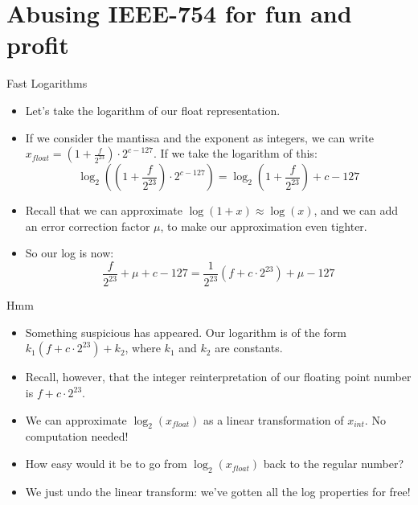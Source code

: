 \documentclass[aspectratio=169]{beamer}
\begin{document}
\section{Abusing IEEE-754 for fun and profit}
\frame{\sectionpage}

\begin{frame}{Fast Logarithms}
    \begin{itemize}
        \item Let's take the logarithm of our float representation. \pause
        \item If we consider the mantissa and the exponent as integers, we can write $x_{float} = (1 + \frac{f}{2^{23}}) \cdot 2^{c - 127}$. If we take the logarithm of this: 
            $$ \log_2 ((1 + \frac{f}{2^{23}}) \cdot 2^{c - 127}) = \log_2(1 + \frac{f}{2^{23}}) + c - 127$$
        \pause 
        \item Recall that we can approximate $\log(1 + x) \approx \log(x)$, and we can add an error correction factor $\mu$, to make our approximation even tighter. \pause 
        \item So our log is now:
        $$ \frac{f}{2^{23}} + \mu + c - 127 = \frac{1}{2^{23}}(f + c \cdot 2^{23}) + \mu - 127$$ 
    \end{itemize}
\end{frame}

\begin{frame}{Hmm}
\begin{itemize}
    \item Something suspicious has appeared. Our logarithm is of the form $k_1(f + c \cdot 2^{23}) + k_2$, where $k_1$ and $k_2$ are constants. \pause 
    

    \item Recall, however, that the integer reinterpretation of our floating point number is $f + c \cdot 2^{23}$. \pause 

    \item We can approximate $\log_2(x_{float})$ as a linear transformation of $x_{int}$. No computation needed! \pause  

    \item How easy would it be to go from $\log_2(x_{float})$ back to the regular number? \pause

    \item We just undo the linear transform: we've gotten all the log properties for free!
\end{itemize}
\end{frame}
\end{document}
